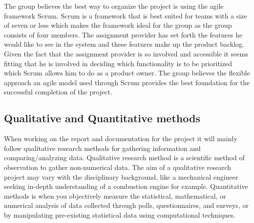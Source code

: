 The group believes the best way to organize the project is using the agile framework Scrum.
Scrum is a framework that is best suited for teams with a size of seven or less \cite{software-engineering-scrum-size} which makes the framework ideal for the group as the group consists of four members.
The assignment provider has set forth the features he would like to see in the system and these features make up the product backlog.
Given the fact that the assignment provider is so involved and accessible it seems fitting that he is involved in deciding which functionality is to be prioritized which Scrum allows him to do as a product owner.
The group believes the flexible approach an agile model used through Scrum provides the best foundation for the successful completion of the project.



\subsection{Qualitative and Quantitative methods} When working on the report and documentation for the project it will mainly follow qualitative research methods for gathering information and comparing/analyzing data. Qualitative research method is a scientific method of observation to gather non-numerical data. The aim of a qualitative research project may vary with the disciplinary background, like a mechanical engineer seeking in-depth understanding of a combustion engine for example\cite{Qualitative-Research}. Quantitative methods is when you objectively measure the statistical, mathematical, or numerical analysis of data collected through polls, questionnaires, and surveys, or by manipulating pre-existing statistical data using computational techniques\cite{Quantitative_Methods}.   
 
